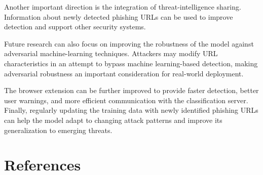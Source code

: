 \documentclass[12pt,a4paper]{report}
\begin{document}
Another important direction is the integration of threat-intelligence sharing. Information about newly detected phishing URLs can be used to improve detection and support other security systems.

Future research can also focus on improving the robustness of the model against adversarial machine-learning techniques. Attackers may modify URL characteristics in an attempt to bypass machine learning-based detection, making adversarial robustness an important consideration for real-world deployment.

The browser extension can be further improved to provide faster detection, better user warnings, and more efficient communication with the classification server. Finally, regularly updating the training data with newly identified phishing URLs can help the model adapt to changing attack patterns and improve its generalization to emerging threats.


\chapter*{References}
\end{document}
